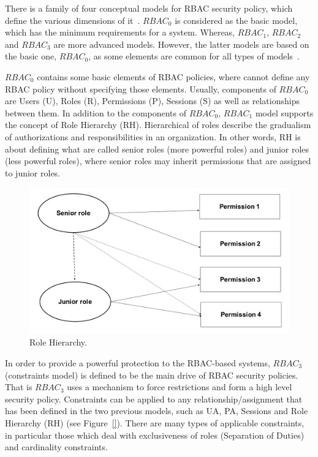 There is a family of four conceptual models for RBAC security policy, which define the various dimensions of it~\cite{PTN2009}. $RBAC_0$ is considered as the basic model, which has the minimum requirements for a system.  Whereas, $RBAC_1$, $RBAC_2$ and $RBAC_3$ are more advanced models.  However, the latter models are based on the basic one, $RBAC_0$, as some elements are common for all types of models~\cite{AhHu2007}.

$RBAC_0$ contains some basic elements of RBAC policies, where cannot define any RBAC policy without specifying those elements.  Usually, components of $RBAC_0$ are Users (U), Roles (R), Permissions (P), Sessions (S) as well as relationships between them. In addition to the components of $RBAC_0$, $RBAC_1$ model supports the concept of Role Hierarchy (RH).  Hierarchical of roles describe the gradualism of authorizations and responsibilities in an organization.  In other words, RH is about defining what are called senior roles (more powerful roles) and junior roles (less powerful roles), where senior roles may inherit permissions that are assigned to junior roles.

\begin{figure}[bht]
\centering
\includegraphics[scale=0.26]{RolesHierachy.png}
\caption{Role Hierarchy.}
\label{fig:RBACPol}
\end{figure}

In order to provide a powerful protection to the RBAC-based systems, $RBAC_3$ (constraints model) is defined to be the main drive of RBAC security policies.  That is $RBAC_3$ uses a mechanism to force restrictions and form a high level security policy.  Constraints can be applied to any relationship/assignment that has been defined in the two previous models, such as UA, PA, Sessions and Role Hierarchy (RH) (see Figure~\ref{}).  There are many types of applicable constraints, in particular those which deal with exclusiveness of roles (Separation of Duties) and cardinality constraints.


